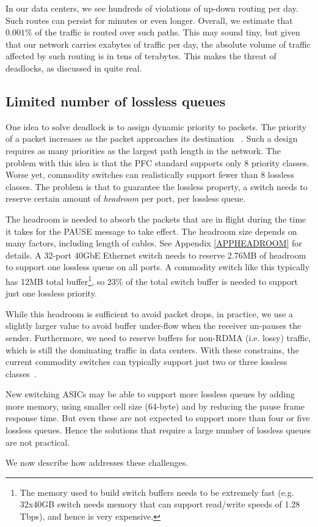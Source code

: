 In our data centers, we see hundreds of violations of up-down routing per
day. Such routes can persist for minutes or even longer. Overall, we estimate
that $0.001\%$ of the traffic is routed over such paths. This may sound tiny,
but given that our network carries exabytes of traffic per day, the absolute
volume of traffic affected by such routing is in tens of terabytes. This makes
the threat of deadlocks, as discussed
in\cite{rdmaatscale,shpiner2016unlocking,hu2016deadlocks} quite real.

\subsection{Limited number of lossless queues}
\label{subsec:pfcheadroom}

One idea to solve deadlock is to assign dynamic priority to packets. The
priority of a packet increases as the packet approaches its destination
~\cite{karol2003prevention}.  Such a design requires as many priorities as the largest 
path length in the network.  The problem with this idea is that the PFC standard
supports only 8 priority classes. Worse yet, commodity switches can
realistically support fewer than 8 lossless classes.  The problem is that  to
guarantee the lossless property, a switch needs to reserve certain amount of
{\it headroom} per port, per lossless queue.

The headroom is needed to absorb the packets that are in flight during the time
it takes for the PAUSE message to take effect.
The headroom size depends on many factors, including length
of cables. See Appendix \ref{APPHEADROOM} for details.  A
32-port 40GbE Ethernet switch needs to reserve 2.76MB of headroom to support one
lossless queue on all ports. A commodity switch like this typically has
12MB total buffer\footnote{The memory used to build switch buffers needs to be
extremely fast (e.g. 32x40GB switch needs memory that can support read/write
speeds of 1.28 Tbps), and hence is very expensive.}, so 23\%
of the total switch buffer is needed to support just one lossless priority.

While this headroom is sufficient to avoid packet drops, in practice, we use a
slightly larger value to avoid buffer under-flow when the receiver un-pauses the
sender.  Furthermore, we need to reserve buffers for non-RDMA (i.e. lossy)
traffic, which is still the dominating traffic in data centers. With these
constrains, the current commodity switches can typically support just two or
three lossless classes~\cite{rdmaatscale}.

New switching ASICs may be able to support more lossless queues by adding more
memory, using smaller cell size (64-byte) and by reducing the pause frame
response time. But even these are not expected to support more than four or five
lossless queues. Hence the solutions that require a large number of lossless
queues are not practical.

We now describe how \sysname{} addresses these challenges.

